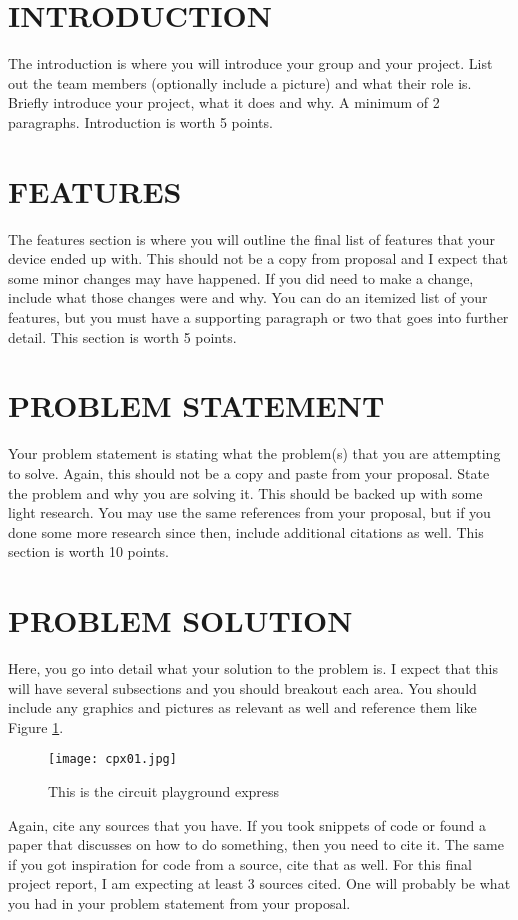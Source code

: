 \documentclass[12pt]{article}
\begin{document}
\section{INTRODUCTION}
The introduction is where you will introduce your group and your project. List out the team members (optionally include a picture) and what their role is. Briefly introduce your project, what it does and why. A minimum of 2 paragraphs. Introduction is worth 5 points.

\section{FEATURES}
The features section is where you will outline the final list of features that your device ended up with. This should not be a copy from proposal and I expect that some minor changes may have happened. If you did need to make a change, include what those changes were and why. You can do an itemized list of your features, but you must have a supporting paragraph or two that goes into further detail. This section is worth 5 points.


\section{PROBLEM STATEMENT}
Your problem statement is stating what the problem(s) that you are attempting to solve. Again, this should not be a copy and paste from your proposal. State the problem and why you are solving it. This should be backed up with some light research. You may use the same references from your proposal, but if you done some more research since then, include additional citations as well. This section is worth 10 points.

\section{PROBLEM SOLUTION}
Here, you go into detail what your solution to the problem is.  I expect that this will have several subsections and you should breakout each area.  You should include any graphics and pictures as relevant as well and reference them like Figure \ref{fig:cpx}.
\begin{figure}[!t]
\centering
\texttt{[image: cpx01.jpg]}
\caption{This is the circuit playground express}
\label{fig:cpx}
\end{figure}

Again, cite any sources that you have.  If you took snippets of code or found a paper that discusses on how to do something, then you need to cite it. The same if you got inspiration for code from a source, cite that as well. For this final project report, I am expecting at least 3 sources cited.  One will probably be what you had in your problem statement from your proposal.  
\end{document}

